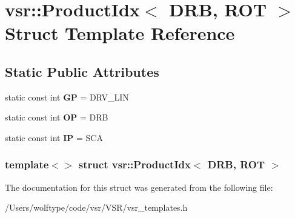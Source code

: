 \hypertarget{structvsr_1_1_product_idx_3_01_d_r_b_00_01_r_o_t_01_4}{\section{vsr\-:\-:Product\-Idx$<$ D\-R\-B, R\-O\-T $>$ Struct Template Reference}
\label{structvsr_1_1_product_idx_3_01_d_r_b_00_01_r_o_t_01_4}
}
\subsection*{Static Public Attributes}
\begin{DoxyCompactItemize}
\item 
\hypertarget{structvsr_1_1_product_idx_3_01_d_r_b_00_01_r_o_t_01_4_a84ce4e4d44185d9f7b3a9fddbb7af6e6}{static const int {\bfseries G\-P} = D\-R\-V\-\_\-\-L\-I\-N}\label{structvsr_1_1_product_idx_3_01_d_r_b_00_01_r_o_t_01_4_a84ce4e4d44185d9f7b3a9fddbb7af6e6}

\item 
\hypertarget{structvsr_1_1_product_idx_3_01_d_r_b_00_01_r_o_t_01_4_ae009b1bb0a335e4888b17b3d7278f68c}{static const int {\bfseries O\-P} = D\-R\-B}\label{structvsr_1_1_product_idx_3_01_d_r_b_00_01_r_o_t_01_4_ae009b1bb0a335e4888b17b3d7278f68c}

\item 
\hypertarget{structvsr_1_1_product_idx_3_01_d_r_b_00_01_r_o_t_01_4_a3953522e69f0d1ebffab3d6bf5dbf531}{static const int {\bfseries I\-P} = S\-C\-A}\label{structvsr_1_1_product_idx_3_01_d_r_b_00_01_r_o_t_01_4_a3953522e69f0d1ebffab3d6bf5dbf531}

\end{DoxyCompactItemize}
\subsubsection*{template$<$$>$ struct vsr\-::\-Product\-Idx$<$ D\-R\-B, R\-O\-T $>$}



The documentation for this struct was generated from the following file\-:\begin{DoxyCompactItemize}
\item 
/\-Users/wolftype/code/vsr/\-V\-S\-R/vsr\-\_\-templates.\-h\end{DoxyCompactItemize}
